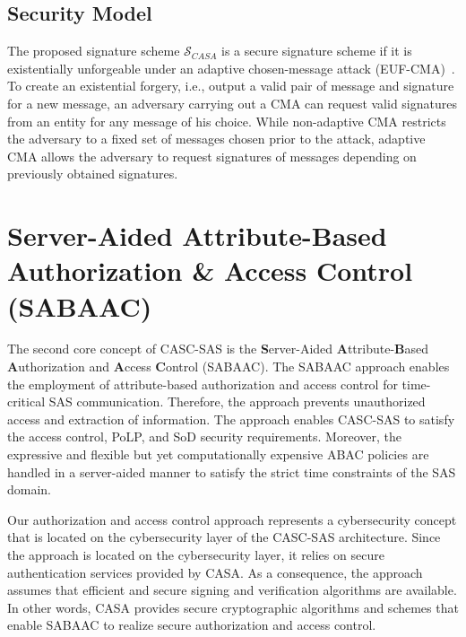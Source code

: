 \subsection{Security Model}
The proposed signature scheme $\mathcal{S}_{CASA}$ is a secure signature scheme if it is existentially unforgeable under an adaptive chosen-message attack (EUF-CMA)~\cite{Boneh2023, Goldwasser1988}.
To create an existential forgery, i.e., output a valid pair of message and signature for a new message, an adversary carrying out a CMA can request valid signatures from an entity for any message of his choice.
While non-adaptive CMA restricts the adversary to a fixed set of messages chosen prior to the attack, adaptive CMA allows the adversary to request signatures of messages depending on previously obtained signatures.

\section{Server-Aided Attribute-Based Authorization \& Access Control (SABAAC)}
\label{sec:approach:sabaac}
The second core concept of CASC-SAS is the \textbf{S}erver-Aided \textbf{A}ttribute-\textbf{B}ased \textbf{A}uthorization and \textbf{A}ccess \textbf{C}ontrol (SABAAC).
The SABAAC approach enables the employment of attribute-based authorization and access control for time-critical SAS communication.
Therefore, the approach prevents unauthorized access and extraction of information.
The approach enables CASC-SAS to satisfy the access control, PoLP, and SoD security requirements.
Moreover, the expressive and flexible but yet computationally expensive ABAC policies are handled in a server-aided manner to satisfy the strict time constraints of the SAS domain.

Our authorization and access control approach represents a cybersecurity concept that is located on the cybersecurity layer of the CASC-SAS architecture.
Since the approach is located on the cybersecurity layer, it relies on secure authentication services provided by CASA.
As a consequence, the approach assumes that efficient and secure signing and verification algorithms are available.
In other words, CASA provides secure cryptographic algorithms and schemes that enable SABAAC to realize secure authorization and access control.

